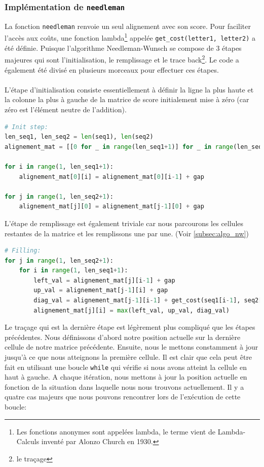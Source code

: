 \documentclass[12pt]{article}
\begin{document}
\subsubsection{Implémentation de \texttt{needleman}}
La fonction \texttt{needleman} renvoie un seul alignement avec son score. Pour faciliter l’accès aux coûts, une fonction lambda\footnote{Les fonctions anonymes sont appelées lambda, le terme vient de Lambda-Calculs inventé par Alonzo Church en 1930.} appelée \texttt{get\_cost(letter1, letter2)} a été définie. Puisque l'algorithme Needleman-Wunsch se compose de 3 étapes majeures qui sont l'initialisation, le remplissage et le trace back\footnote{le traçage}. Le code a également été divisé en plusieurs morceaux pour effectuer ces étapes. \\\\
L’étape d’initialisation consiste essentiellement à définir la ligne la plus haute et la colonne la plus à gauche de la matrice de score initialement mise à zéro (car zéro est l'élément neutre de l’addition).\\
\begin{lstlisting}[caption={Phase d'initialisation}, language=Python]
# Init step:
len_seq1, len_seq2 = len(seq1), len(seq2)
alignement_mat = [[0 for _ in range(len_seq1+1)] for _ in range(len_seq2+1)]

for i in range(1, len_seq1+1):
    alignement_mat[0][i] = alignement_mat[0][i-1] + gap

for j in range(1, len_seq2+1):
    alignement_mat[j][0] = alignement_mat[j-1][0] + gap
\end{lstlisting}
L'étape de remplissage est également triviale car nous parcourons les cellules restantes de la matrice et les remplissons une par une. (Voir \ref{subsec:algo_nw}) \\
\begin{lstlisting}[caption={Phase de remplissage}, language=Python]
# Filling:
for j in range(1, len_seq2+1):
    for i in range(1, len_seq1+1):
        left_val = alignement_mat[j][i-1] + gap
        up_val = alignement_mat[j-1][i] + gap
        diag_val = alignement_mat[j-1][i-1] + get_cost(seq1[i-1], seq2[j-1])
        alignement_mat[j][i] = max(left_val, up_val, diag_val)
\end{lstlisting}
Le traçage qui est la dernière étape est légèrement plus compliqué que les étapes précédentes. Nous définissons d'abord notre position actuelle sur la dernière cellule de notre matrice précédente. Ensuite, nous le mettons constamment à jour jusqu'à ce que nous atteignons la première cellule. Il est clair que cela peut être fait en utilisant une boucle \texttt{while} qui vérifie si nous avons atteint la cellule en haut à gauche. A chaque itération, nous mettons à jour la position actuelle en fonction de la situation dans laquelle nous nous trouvons actuellement. Il y a quatre cas majeurs que nous pouvons rencontrer lors de l'exécution de cette boucle:
\end{document}

